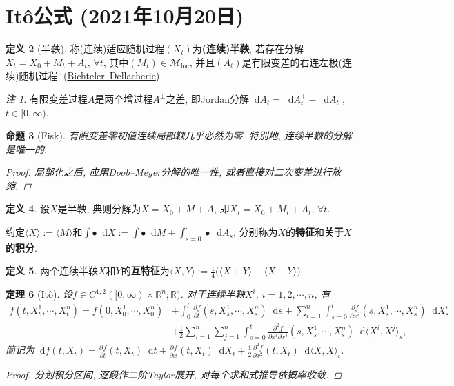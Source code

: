 \documentclass{ctexart}
\theoremstyle{definition}
\newtheorem{Def}{定义}[section]
\theoremstyle{remark}
\newtheorem{Rmk}[Def]{注}
\theoremstyle{plain}
\newtheorem{Prop}[Def]{命题}
\newtheorem{Thm}[Def]{定理}
\newcommand{\1}{\mathbbm{1}}				%
\newcommand{\agp}[1]{\langle #1 \rangle}	%
\newcommand{\R}{\mathbb{R}}					%
\renewcommand*{\d}{\mathop{}\!\mathrm{d}}	%
\newcommand{\pd}{\partial}					%
\newcommand{\p}[3][]{\frac{\pd^{#1}#2}{\pd{#3}^{#1}}}%
\begin{document}
\section{It\^{o}公式 \normalfont\footnotesize (2021年10月20日)}
\begin{Def}[半鞅]\label{Def:semi-martingale}
称(连续)适应随机过程$(X_{t})$为\textbf{(连续)半鞅}, 若存在分解$X_{t} = X_{0} + M_{t} + A_{t} ,\, \forall t$, 其中$(M_{t}) \in \mathcal{M}_{\mathrm{loc}}$, 并且$(A_{t})$是有限变差的右连左极(连续)随机过程. \hfill (\href{https://almostsuremath.com/2011/03/28/the-bichteler-dellacherie-theorem/}{Bichteler--Dellacherie})
\begin{Rmk}
有限变差过程$A$是两个增过程$A^\pm$之差, 即Jordan分解$\d A_{t} = \d A^{+}_{t} - \d A^{-}_{t}$, $t \in [0,\infty)$.
\end{Rmk}
\end{Def}
\begin{Prop}[Fisk]
有限变差零初值\emph{连续}局部鞅几乎必然为零. 特别地, \emph{连续}半鞅的分解是唯一的.
\begin{proof}
局部化之后, 应用Doob--Meyer分解的唯一性, 或者直接对二次变差进行放缩.
\end{proof}
\end{Prop}

\begin{Def}
设$X$是半鞅, 典则分解为$X = X_{0} + M + A$, 即$X_{t} = X_{0} + M_{t} + A_{t} ,\, \forall t$.\par 约定$\agp{X} := \agp{M}$和$\int \bullet \d X := \int \bullet \d M + \int_{s=0}^{\bm{\cdot}} \bullet \d A_{s}$, 分别称为$X$的\textbf{特征}和\textbf{关于$X$的积分}.
\end{Def}
\begin{Def}
两个连续半鞅$X$和$Y$的\textbf{互特征}为$\agp{X,Y} := \frac{1}{4}\big(\agp{X+Y}-\agp{X-Y}\big)$.
\end{Def}

\begin{Thm}[It\^{o}]
设$f \in C^{1,2}([0,\infty)\times\R^{n};\R)$. 对于连续半鞅$X^{i}$, $i = 1,2,\cdots,n$, 有
\[\begin{aligned}
f(t,X^{1}_{t},\cdots,X^{n}_{t}) = f(0,X^{1}_{0},\cdots,X^{n}_{0}) &+ \int_{0}^{t}\p{f}{t}(s,X^{1}_{s},\cdots,X^{n}_{s}) \d s + \sum_{i=1}^{n}\int_{s=0}^{t} \p{f}{x^i}(s,X^{1}_{s},\cdots,X^{n}_{s}) \d X^{i}_{s} \\ &+ \frac{1}{2}\sum_{i=1}^{n}\sum_{j=1}^{n} \int_{s=0}^{t} \frac{\pd^{2}f}{\pd{x^i}\pd{x^j}}(s,X^{1}_{s},\cdots,X^{n}_{s}) \d\agp{X^{i},X^{j}}_{s} , 
\end{aligned}\]
简记为$\d f(t,X_{t}) = \p{f}{t}(t,X_{t}) \d t + \p{f}{x}(t,X_{t}) \d X_{t} + \frac{1}{2}\p[2]{f}{x}(t,X_{t}) \d\agp{X,X}_{t}$.
\begin{proof}
分划积分区间, 逐段作二阶Taylor展开, 对每个求和式推导依概率收敛.
\end{proof}
\end{Thm}
\end{document}
